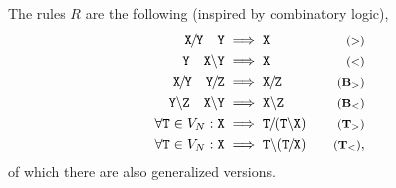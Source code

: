 The rules $R$ are the following (inspired by combinatory logic),
\begin{align*}
  \cat{X \fs Y} \hspace{1em} \cat{Y} &\implies \cat{X} & \text{\footnotesize $(>)$} \\
  \cat{Y} \hspace{1em} \cat{X \bs Y} &\implies \cat{X} & \text{\footnotesize $(<)$} \\
  \cat{X \fs Y} \hspace{1em} \cat{Y \fs Z} &\implies \cat{X \fs Z} & \text{\footnotesize $(\mathbf{B}_>)$} \\
  \cat{Y \bs Z} \hspace{1em} \cat{X \bs Y} &\implies \cat{X \bs Z} & \text{\footnotesize $(\mathbf{B}_<)$} \\
  \forall \cat{T}\in V_N : \cat{X} &\implies \cat{T \fs (T \bs X)} & \text{\footnotesize $(\mathbf{T}_>)$} \\
  \forall \cat{T}\in V_N : \cat{X} &\implies \cat{T \bs (T \fs X)} & \text{\footnotesize $(\mathbf{T}_<)$}
,\end{align*}
of which there are also generalized versions.

